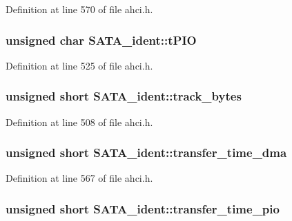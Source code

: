 Definition at line 570 of file ahci.\+h.

\subsubsection[{\texorpdfstring{t\+P\+IO}{tPIO}}]{\setlength{\rightskip}{0pt plus 5cm}unsigned char S\+A\+T\+A\+\_\+ident\+::t\+P\+IO}\hypertarget{structSATA__ident_abf328a06ef3d38cbde3b259c09504510}{}\label{structSATA__ident_abf328a06ef3d38cbde3b259c09504510}


Definition at line 525 of file ahci.\+h.

\subsubsection[{\texorpdfstring{track\+\_\+bytes}{track_bytes}}]{\setlength{\rightskip}{0pt plus 5cm}unsigned short S\+A\+T\+A\+\_\+ident\+::track\+\_\+bytes}\hypertarget{structSATA__ident_afc42e0fec367087ac600bf1eee537efb}{}\label{structSATA__ident_afc42e0fec367087ac600bf1eee537efb}


Definition at line 508 of file ahci.\+h.

\subsubsection[{\texorpdfstring{transfer\+\_\+time\+\_\+dma}{transfer_time_dma}}]{\setlength{\rightskip}{0pt plus 5cm}unsigned short S\+A\+T\+A\+\_\+ident\+::transfer\+\_\+time\+\_\+dma}\hypertarget{structSATA__ident_a5b0a4388fb4ed0a5d087053c492ac6e8}{}\label{structSATA__ident_a5b0a4388fb4ed0a5d087053c492ac6e8}


Definition at line 567 of file ahci.\+h.

\subsubsection[{\texorpdfstring{transfer\+\_\+time\+\_\+pio}{transfer_time_pio}}]{\setlength{\rightskip}{0pt plus 5cm}unsigned short S\+A\+T\+A\+\_\+ident\+::transfer\+\_\+time\+\_\+pio}\hypertarget{structSATA__ident_a39b24989e9dc3b2c7c09434f64318cbf}{}\label{structSATA__ident_a39b24989e9dc3b2c7c09434f64318cbf}


